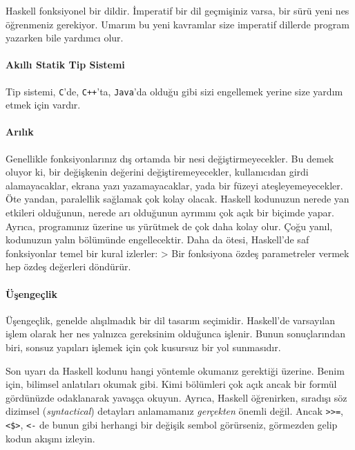 \documentclass[a4paper,14pt,openany]{extbook} %
\let\oldparagraph\paragraph
\renewcommand{\paragraph}[1]{\oldparagraph{#1}\mbox{}}
\let\emph\textit
\begin{document}
Haskell fonksiyonel bir dildir. İmperatif bir dil geçmişiniz
varsa, bir sürü yeni nes öğrenmeniz gerekiyor. Umarım bu yeni kavramlar
size imperatif dillerde program yazarken bile yardımcı olur.

\paragraph{Akıllı Statik Tip Sistemi}\label{akux131llux131-statik-tip-sistemi}

Tip sistemi, \lstinline!C!'de, \lstinline!C++!'ta, \lstinline!Java!'da
olduğu gibi sizi engellemek yerine size yardım etmek için vardır.

\paragraph{Arılık}\label{saflux131k} %

Genellikle fonksiyonlarınız dış ortamda bir nesi değiştirmeyecekler. Bu
demek oluyor ki, bir değişkenin değerini değiştiremeyecekler,
kullanıcıdan girdi alamayacaklar, ekrana yazı yazamayacaklar, yada bir
füzeyi ateşleyemeyecekler. Öte %
yandan, paralellik sağlamak çok kolay
olacak. Haskell kodunuzun nerede yan etkileri olduğunun, nerede arı
olduğunun ayrımını çok açık bir biçimde yapar. Ayrıca, programınız
üzerine us yürütmek de çok daha kolay olur. Çoğu yanıl, kodunuzun
yalın bölümünde engellecektir.
Daha da ötesi, Haskell'de saf fonksiyonlar temel bir kural izlerler:
\textgreater{} Bir fonksiyona özdeş parametreler vermek hep özdeş
değerleri döndürür.

\paragraph{Üşengeçlik}\label{üsengeclik}

Üşengeçlik, genelde alışılmadık bir dil tasarım seçimidir. Haskell'de
varsayılan işlem olarak her nes yalnızca gereksinim olduğunca işlenir.
Bunun sonuçlarından biri, sonsuz yapıları işlemek için çok kusursuz %
bir yol sunmasıdır.

Son uyarı da Haskell kodunu hangi yöntemle okumanız gerektiği üzerine. Benim
için, bilimsel anlatıları okumak gibi. Kimi bölümleri çok açık ancak bir
formül gördünüzde odaklanarak yavaşça okuyun. Ayrıca, Haskell
öğrenirken, sıradışı %
söz dizimsel (\emph{syntactical}) detayları anlamamanız \emph{gerçekten}
önemli değil. Ancak \lstinline!>>=!, \lstinline!<$>!, \lstinline!<-!
de bunun gibi herhangi bir değişik sembol görürseniz, görmezden gelip kodun
akışını izleyin.
\end{document}
